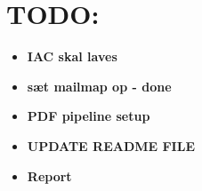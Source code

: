 \section{TODO:}
\begin{itemize}
    \item\textbf{IAC skal laves}
    \item\textbf{sæt mailmap op - done}
    \item\textbf{PDF pipeline setup}
    \item\textbf{UPDATE README FILE}
    \item\textbf{Report}
    
\end{itemize}